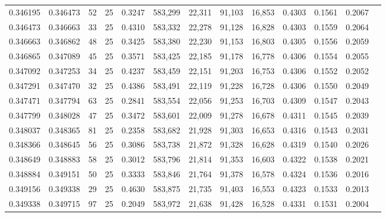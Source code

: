 \begin{tabular}{rrrrrrrrrrrrr}
0.346195 & 0.346473 &    52 &  25 &                                     0.3247 & 583,299 &  22,311 &  91,103 &  16,853 & 0.4303 & 0.1561 & 0.2067 \\
0.346473 & 0.346663 &    33 &  25 &                                     0.4310 & 583,332 &  22,278 &  91,128 &  16,828 & 0.4303 & 0.1559 & 0.2064 \\
0.346663 & 0.346862 &    48 &  25 &                                     0.3425 & 583,380 &  22,230 &  91,153 &  16,803 & 0.4305 & 0.1556 & 0.2059 \\
0.346865 & 0.347089 &    45 &  25 &                                     0.3571 & 583,425 &  22,185 &  91,178 &  16,778 & 0.4306 & 0.1554 & 0.2055 \\
0.347092 & 0.347253 &    34 &  25 &                                     0.4237 & 583,459 &  22,151 &  91,203 &  16,753 & 0.4306 & 0.1552 & 0.2052 \\
0.347291 & 0.347470 &    32 &  25 &                                     0.4386 & 583,491 &  22,119 &  91,228 &  16,728 & 0.4306 & 0.1550 & 0.2049 \\
0.347471 & 0.347794 &    63 &  25 &                                     0.2841 & 583,554 &  22,056 &  91,253 &  16,703 & 0.4309 & 0.1547 & 0.2043 \\
0.347799 & 0.348028 &    47 &  25 &                                     0.3472 & 583,601 &  22,009 &  91,278 &  16,678 & 0.4311 & 0.1545 & 0.2039 \\
0.348037 & 0.348365 &    81 &  25 &                                     0.2358 & 583,682 &  21,928 &  91,303 &  16,653 & 0.4316 & 0.1543 & 0.2031 \\
0.348366 & 0.348645 &    56 &  25 &                                     0.3086 & 583,738 &  21,872 &  91,328 &  16,628 & 0.4319 & 0.1540 & 0.2026 \\
0.348649 & 0.348883 &    58 &  25 &                                     0.3012 & 583,796 &  21,814 &  91,353 &  16,603 & 0.4322 & 0.1538 & 0.2021 \\
0.348884 & 0.349151 &    50 &  25 &                                     0.3333 & 583,846 &  21,764 &  91,378 &  16,578 & 0.4324 & 0.1536 & 0.2016 \\
0.349156 & 0.349338 &    29 &  25 &                                     0.4630 & 583,875 &  21,735 &  91,403 &  16,553 & 0.4323 & 0.1533 & 0.2013 \\
0.349338 & 0.349715 &    97 &  25 &                                     0.2049 & 583,972 &  21,638 &  91,428 &  16,528 & 0.4331 & 0.1531 & 0.2004 \\

\end{tabular}
